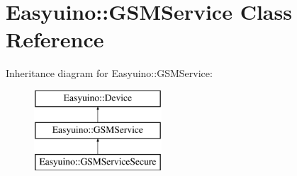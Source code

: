\hypertarget{class_easyuino_1_1_g_s_m_service}{}\section{Easyuino\+:\+:G\+S\+M\+Service Class Reference}
\label{class_easyuino_1_1_g_s_m_service}
Inheritance diagram for Easyuino\+:\+:G\+S\+M\+Service\+:\begin{figure}[H]
\begin{center}
\leavevmode
\includegraphics[height=3.000000cm]{class_easyuino_1_1_g_s_m_service}
\end{center}
\end{figure}
